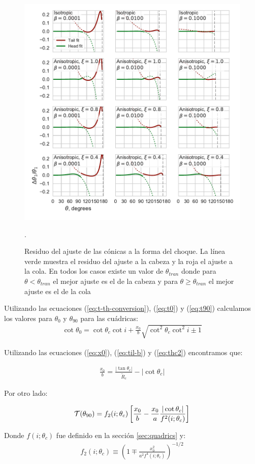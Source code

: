  \begin{figure}
   \includegraphics[width=0.5\linewidth]{./Figures/conic-head-tail-residuals}
   \caption{Residuo del ajuste de las cónicas a la forma del choque. La línea verde muestra el residuo del ajuste a la cabeza y la roja el ajuste a la cola. En todos los casos existe un valor de $\theta_{tran}$ donde para $\theta < \theta_{tran}$ el mejor ajuste es el de la cabeza y para $\theta \geq \theta_{tran}$ el mejor ajuste es el de la cola}.
   \label{fig:residuals}
 \end{figure}

 Utilizando las ecuaciones (\ref{eq:t-th-conversion}), (\ref{eq:t0}) y (\ref{eq:t90}) calculamos los valores para $\theta_0$ y $\theta_{90}$ para las cuádricas:
 \begin{align}
   \cot\theta_0 = \cot\theta_c\cot{i} + \frac{x_0}{b} \sqrt{\cot^2\theta_c\cot^2{i}\pm 1}
 \end{align}

 Utilizando las ecuaciones (\ref{eq:x0}), (\ref{eq:til-b}) y (\ref{eq:thc2}) encontramos que:

 \begin{align}
   \frac{x_0}{b} = \frac{|\tan\theta_c|}{\tilde{R}_c} - |\cot\theta_c|
 \end{align}

 Por otro lado:

 \begin{align}
   \mathcal{T}(\theta_{90}) = f_2(i;\theta_c)\left[\frac{x_0}{b} - \frac{x_0}{a}\frac{|\cot \theta_c|}{f^2(i;\theta_c)}\right] 
 \end{align}

 Donde $f(i;\theta_c)$ fue definido en la sección \ref{sec:quadrics} y:
 \begin{align}
   f_2(i;\theta_c)\equiv\left(1 \mp \frac{x^2_0}{a^2f^4(i;\theta_c)}\right)^{-1/2}
 \end{align}

 
